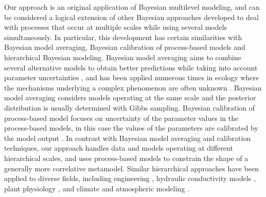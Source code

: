 Our approach is an original application of Bayesian multilevel modeling, and can be considered a logical extension of other Bayesian approaches developed to deal with processes that occur at multiple scales while using several models simultaneously. 
In particular, this development has certain similarities with Bayesian model averaging, Bayesian calibration of process-based models and hierarchical Bayesian modeling. 
Bayesian model averaging aims to combine several alternative models to obtain better predictions while taking into account parameter uncertainties \citep{Hoeting1999}, and has been applied numerous times in ecology where the mechanisms underlying a complex phenomenon are often unknown \citep[e.g.][]{Wintle2003, Link2006}. 
Bayesian model averaging considers models operating at the same scale and the posterior distribution is usually determined with Gibbs sampling. 
Bayesian calibration of process-based model focuses on uncertainty of the parameter values in the process-based models, in this case the values of the parameters are calibrated by the model output \citep{VanOijen2005, VanOijen2011, Hartig2012}. 
In contrast with Bayesian model averaging and calibration techniques, our approach handles data and models operating at different hierarchical scales, and uses process-based models to constrain the shape of a generally more correlative metamodel.
Similar hierarchical approaches have been applied to diverse fields, including engineering \citep{Booth2013}, hydraulic conductivity models \citep{Dostert2009, Efendiev2005, Efendiev2005a}, plant physiology \citep{Ogle2008, Ogle2009}, and climate and atmospheric modeling \citep{Zimmerman2005, Mcmillan2010, Kang2012}.

